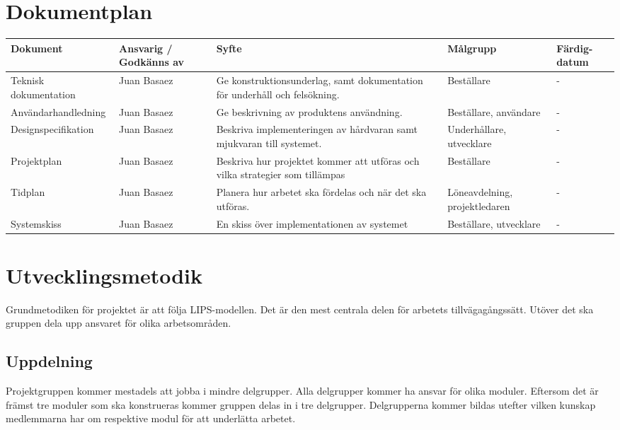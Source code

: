 \documentclass[projektplan/plan.tex]{subfiles}
\begin{document}
\section{Dokumentplan}
{\renewcommand{\arraystretch}{1.6}
\begin{longtable}{p{4.5cm}p{1.5cm}p{5cm}p{2.2cm}p{1.2cm}}
    \bfseries Dokument &
    \bfseries Ansvarig / Godkänns av &
    \bfseries Syfte &
    \bfseries Målgrupp &
    \bfseries Färdig-datum \\\hline
    Teknisk dokumentation &
    Juan Basaez &
    Ge konstruktionsunderlag, samt dokumentation för underhåll och
    felsökning. &
    Beställare &
    -
    \\
    Användarhandledning &
    Juan Basaez &
    Ge beskrivning av produktens användning. &
    Beställare, användare &
    -
    \\
    Designspecifikation &
    Juan Basaez &
    Beskriva implementeringen av hårdvaran samt mjukvaran till systemet. &
    Underhållare, utvecklare &
    -
    \\
    Projektplan &
    Juan Basaez &
    Beskriva hur projektet kommer att utföras och vilka strategier som
    tillämpas &
    Beställare &
    -
    \\
    Tidplan &
    Juan Basaez &
    Planera hur arbetet ska fördelas och när det ska utföras. &
    Löne\-avdelning, projekt\-ledaren &
    -
    \\
    Systemskiss &
    Juan Basaez &
    En skiss över implementationen av systemet &
    Beställare, utvecklare &
    -
    \\
    
    \endhead
\end{longtable}}
\newpage
\section{Utvecklingsmetodik}
Grundmetodiken för projektet är att följa LIPS-modellen. Det är den mest centrala delen för arbetets tillvägagångssätt. Utöver det ska gruppen dela upp ansvaret för olika arbetsområden.
\subsection{Uppdelning}
Projektgruppen kommer mestadels att jobba i mindre delgrupper. Alla delgrupper kommer ha ansvar för olika moduler. Eftersom det är främst tre moduler som ska konstrueras kommer gruppen delas in i tre delgrupper. Delgrupperna kommer bildas utefter vilken kunskap medlemmarna har om respektive modul för att underlätta arbetet.
\end{document}
